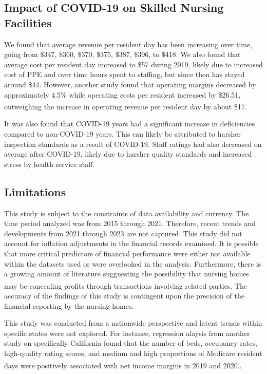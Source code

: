 \documentclass{article}
\theoremstyle{mytheoremstyle}
\theoremstyle{mytheoremstyle}
\theoremstyle{myproblemstyle}
\begin{document}
\subsection{Impact of COVID-19 on Skilled Nursing Facilities}
We found that average revenue per resident day has been increasing over time, going from \$347, \$360, \$370, \$375, \$387, \$396, to \$418. We also found that average cost per resident day increased  to \$57 during 2019, likely due to increased cost of PPE and over time hours spent to staffing, but since then has stayed around \$44. However, another study found that operating margins decreased by approximately 4.5\% while operating costs per resident increased by \$26.51, outweighing the increase in operating revenue per resident day by about \$17\textsuperscript{\cite{orewa2024}}.

It was also found that COVID-19 years had a significant increase in deficiencies compared to non-COVID-19 years. This can likely be attributed to harsher inspection standards as a result of COVID-19. Staff ratings had also decreased on average after COVID-19, likely due to harsher quality standards and increased stress by health service staff.   

\subsection{Limitations}

This study is subject to the constraints of data availability and currency. The time period analyzed was from 2015 through 2021. Therefore, recent trends and developments from 2021 through 2023 are not captured. This study did not account for inflation adjustments in the financial records examined. It is possible that more critical predictors of financial performance were either not available within the datasets used or were overlooked in the analysis. Furthermore, there is a growing amount of literature sugguesting the possibility that nursing homes may be concealing profits through transactions involving related parties\textsuperscript{\cite{harrington2024united}}. The accuracy of the findings of this study is contingent upon the precision of the financial reporting by the nursing homes. 

This study was conducted from a nationwide perspective and latent trends within specific states were not explored. For instance, regression alaysis from another study on specifically California  found that the number of beds, occupancy rates, high-quality rating scores, and medium and high proportions of Medicare resident days were positively associated with net income margins in 2019 and 2020.\textsuperscript{\cite{Harrington2023}}. 
\end{document}
